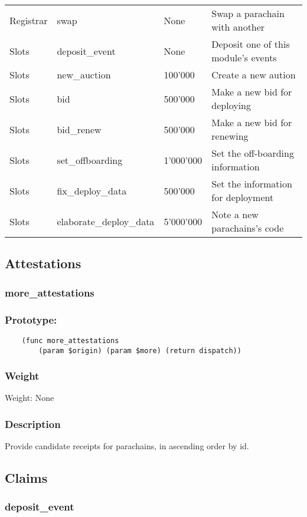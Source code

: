\documentclass[11pt,a4paper]{article}
\begin{document}
\begin{center}
\begin{tabulary}{1.0\textwidth}{LLLL}
    Registrar & swap & None & Swap a parachain with another \\
    Slots & deposit\_event & None & Deposit one of this module's events \\
    Slots & new\_auction & 100'000 & Create a new aution \\
    Slots & bid & 500'000 & Make a new bid for deploying \\
    Slots & bid\_renew & 500'000 & Make a new bid for renewing \\
    Slots & set\_offboarding & 1'000'000 & Set the off-boarding information \\
    Slots & fix\_deploy\_data & 500'000 & Set the information for deployment \\
    Slots & elaborate\_deploy\_data & 5'000'000 & Note a new parachains's code \\
  \end{tabulary}
\end{center}
\newpage

\subsection{Attestations}
\subsubsection{more\_attestations}
\subsubsection*{Prototype:}
\begin{verbatim}
    (func more_attestations
        (param $origin) (param $more) (return dispatch))
\end{verbatim}
\subsubsection*{Weight}
Weight: None
\subsubsection*{Description}
Provide candidate receipts for parachains, in ascending order by id.

\subsection{Claims}
\subsubsection{deposit\_event}
\end{document}
